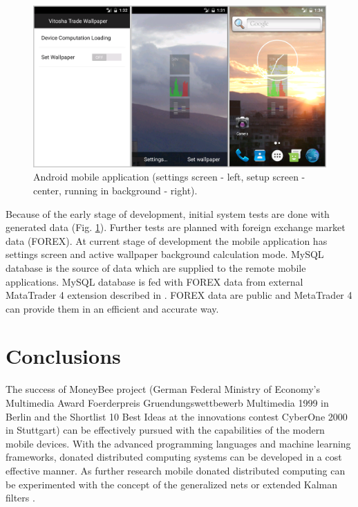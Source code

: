 \documentclass{llncs}
\begin{document}
\begin{figure}
  \includegraphics[width=1.0\linewidth]{fig02}
  \caption{Android mobile application (settings screen - left, setup screen - center, running in background - right).}
  \label{fig02}
\end{figure}
\FloatBarrier

Because of the early stage of development, initial system tests are done with generated data (Fig. \ref{fig02}). Further tests are planned with foreign exchange market data (FOREX). At current stage of development the mobile application has settings screen and active wallpaper background calculation mode.  MySQL database is the source of data which are supplied to the remote mobile applications. MySQL database is fed with FOREX data from external MataTrader 4 extension described in \cite{balabanov05}. FOREX data are public and MetaTrader 4 \cite{blackledge01} can provide them in an efficient and accurate way. 

\section{Conclusions} \label{Conclusions}

The success of MoneyBee project (German Federal Ministry of Economy's Multimedia Award Foerderpreis Gruendungswettbewerb Multimedia 1999 in Berlin and the Shortlist 10 Best Ideas at the innovations contest CyberOne 2000 in Stuttgart) can be effectively pursued with the capabilities of the modern mobile devices. With the advanced programming languages and machine learning frameworks, donated distributed computing systems can be developed in a cost effective manner. As further research mobile donated distributed computing can be experimented with the concept of the generalized nets \cite{tashev01,tashev02} or extended Kalman filters \cite{alexandrov01}.
\end{document}
